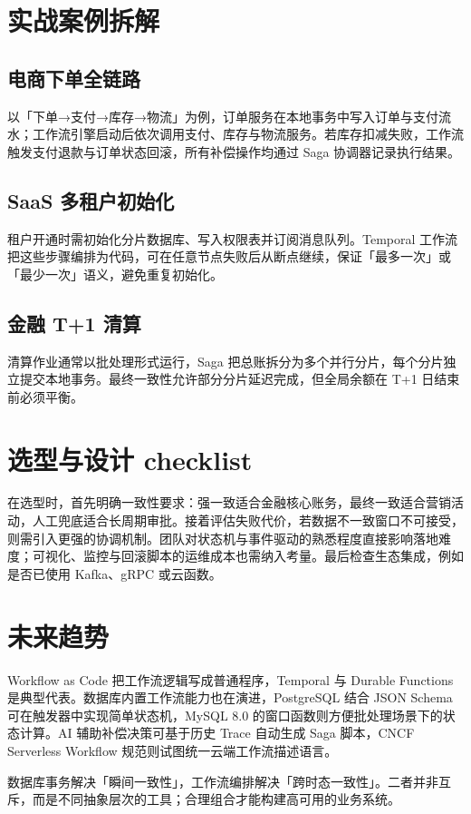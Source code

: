 \chapter{实战案例拆解}
\section{电商下单全链路}
以「下单→支付→库存→物流」为例，订单服务在本地事务中写入订单与支付流水；工作流引擎启动后依次调用支付、库存与物流服务。若库存扣减失败，工作流触发支付退款与订单状态回滚，所有补偿操作均通过 Saga 协调器记录执行结果。\par
\section{SaaS 多租户初始化}
租户开通时需初始化分片数据库、写入权限表并订阅消息队列。Temporal 工作流把这些步骤编排为代码，可在任意节点失败后从断点继续，保证「最多一次」或「最少一次」语义，避免重复初始化。\par
\section{金融 T+1 清算}
清算作业通常以批处理形式运行，Saga 把总账拆分为多个并行分片，每个分片独立提交本地事务。最终一致性允许部分分片延迟完成，但全局余额在 T+1 日结束前必须平衡。\par
\chapter{选型与设计 checklist}
在选型时，首先明确一致性要求：强一致适合金融核心账务，最终一致适合营销活动，人工兜底适合长周期审批。接着评估失败代价，若数据不一致窗口不可接受，则需引入更强的协调机制。团队对状态机与事件驱动的熟悉程度直接影响落地难度；可视化、监控与回滚脚本的运维成本也需纳入考量。最后检查生态集成，例如是否已使用 Kafka、gRPC 或云函数。\par
\chapter{未来趋势}
Workflow as Code 把工作流逻辑写成普通程序，Temporal 与 Durable Functions 是典型代表。数据库内置工作流能力也在演进，PostgreSQL 结合 JSON Schema 可在触发器中实现简单状态机，MySQL 8.0 的窗口函数则方便批处理场景下的状态计算。AI 辅助补偿决策可基于历史 Trace 自动生成 Saga 脚本，CNCF Serverless Workflow 规范则试图统一云端工作流描述语言。\par
数据库事务解决「瞬间一致性」，工作流编排解决「跨时态一致性」。二者并非互斥，而是不同抽象层次的工具；合理组合才能构建高可用的业务系统。\par
